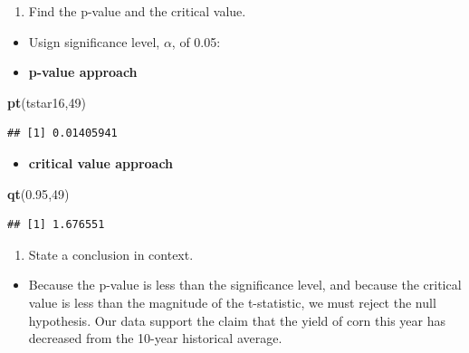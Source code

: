 \documentclass[
  openany]{book}
\newenvironment{Shaded}{\begin{snugshade}}{\end{snugshade}}
\newcommand{\DecValTok}[1]{\textcolor[rgb]{0.00,0.00,0.81}{#1}}
\newcommand{\FloatTok}[1]{\textcolor[rgb]{0.00,0.00,0.81}{#1}}
\newcommand{\FunctionTok}[1]{\textcolor[rgb]{0.13,0.29,0.53}{\textbf{#1}}}
\newcommand{\NormalTok}[1]{#1}
\providecommand{\tightlist}{%
  \setlength{\itemsep}{0pt}\setlength{\parskip}{0pt}}
\begin{document}
\begin{enumerate}
\def\labelenumi{\alph{enumi}.}
\setcounter{enumi}{2}
\tightlist
\item
  Find the p-value and the critical value.
\end{enumerate}

\begin{itemize}
\tightlist
\item
  Usign significance level, \(\alpha\), of 0.05:
\item
  \textbf{p-value approach}
\end{itemize}

\begin{Shaded}
\begin{Highlighting}[]
\FunctionTok{pt}\NormalTok{(tstar16,}\DecValTok{49}\NormalTok{)}
\end{Highlighting}
\end{Shaded}

\begin{verbatim}
## [1] 0.01405941
\end{verbatim}

\begin{itemize}
\tightlist
\item
  \textbf{critical value approach}
\end{itemize}

\begin{Shaded}
\begin{Highlighting}[]
\FunctionTok{qt}\NormalTok{(}\FloatTok{0.95}\NormalTok{,}\DecValTok{49}\NormalTok{)}
\end{Highlighting}
\end{Shaded}

\begin{verbatim}
## [1] 1.676551
\end{verbatim}

\begin{enumerate}
\def\labelenumi{\alph{enumi}.}
\setcounter{enumi}{3}
\tightlist
\item
  State a conclusion in context.
\end{enumerate}

\begin{itemize}
\tightlist
\item
  Because the p-value is less than the significance level, and because the critical value is less than the magnitude of the t-statistic, we must reject the null hypothesis. Our data support the claim that the yield of corn this year has decreased from the 10-year historical average.
\end{itemize}
\end{document}
